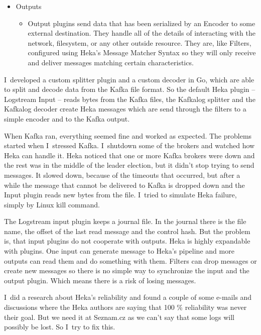 \begin{itemize}
\begin{itemize}
    \end{itemize}
  \item	Outputs
    \begin{itemize}
      \item Output plugins send data that has been serialized by an Encoder to some external destination. They handle all of the details of interacting with the network, filesystem, or any other outside resource. They are, like Filters, configured using Heka’s Message Matcher Syntax so they will only receive and deliver messages matching certain characteristics.
    \end{itemize}
\end{itemize}

I~developed a custom splitter plugin and a custom decoder in Go, which are able to split and decode data from the Kafka file format. So the default Heka plugin -- Logstream Input -- reads bytes from the Kafka files, the Kafkalog splitter and the Kafkalog decoder create Heka messages which are send through the filters to a simple encoder and to the Kafka output.

When Kafka ran, everything seemed fine and worked as expected. The problems started when I~stressed Kafka. I~shutdown some of the brokers and watched how Heka can handle it. Heka noticed that one or more Kafka brokers were down and the rest was in the middle of the leader election, but it didn’t stop trying to send messages. It slowed down, because of the timeouts that occurred, but after a while the message that cannot be delivered to Kafka is dropped down and the Input plugin reads new bytes from the file. I~tried to simulate Heka failure, simply by Linux kill command.

The Logstream input plugin keeps a journal file. In the journal there is the file name, the offset of the last read message and the control hash. But the problem is, that input plugins do not cooperate with outputs. Heka is highly expandable with plugins. One input can generate message to Heka’s pipeline and more outputs can read them and do something with them. Filters can drop messages or create new messages so there is no simple way to synchronize the input and the output plugin. Which means there is a risk of losing messages.
 
I~did a research about Heka’s reliability and found a couple of some e-mails and discussions where the Heka authors are saying that 100 \% reliability was never their goal. But we need it at Seznam.cz as we can’t say that some logs will possibly be lost. So I~try to fix this.

